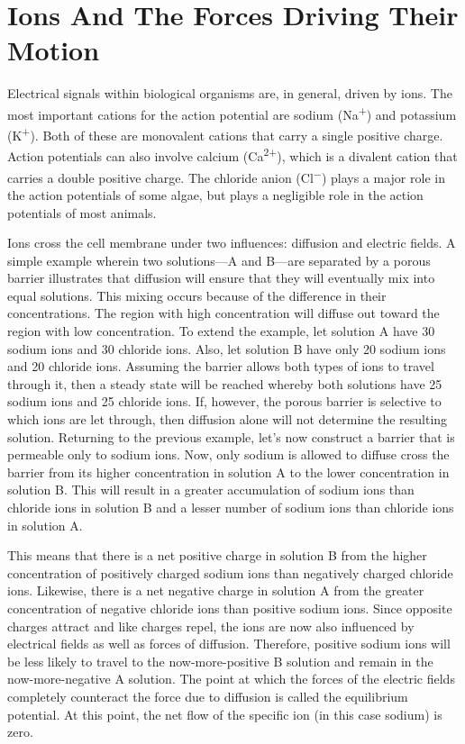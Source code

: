 \hypertarget{ions-and-the-forces-driving-their-motion}{%
\section{Ions And The Forces Driving Their Motion}\label{ions-and-the-forces-driving-their-motion}}

Electrical signals within biological organisms are, in general, driven by ions. The most important cations for the action potential are sodium (Na\textsuperscript{+}) and potassium (K\textsuperscript{+}). Both of these are monovalent cations that carry a single positive charge. Action potentials can also involve calcium (Ca\textsuperscript{2+}), which is a divalent cation that carries a double positive charge. The chloride anion (Cl\textsuperscript{−}) plays a major role in the action potentials of some algae, but plays a negligible role in the action potentials of most animals.

Ions cross the cell membrane under two influences: diffusion and electric fields. A simple example wherein two solutions---A and B---are separated by a porous barrier illustrates that diffusion will ensure that they will eventually mix into equal solutions. This mixing occurs because of the difference in their concentrations. The region with high concentration will diffuse out toward the region with low concentration. To extend the example, let solution A have 30 sodium ions and 30 chloride ions. Also, let solution B have only 20 sodium ions and 20 chloride ions. Assuming the barrier allows both types of ions to travel through it, then a steady state will be reached whereby both solutions have 25 sodium ions and 25 chloride ions. If, however, the porous barrier is selective to which ions are let through, then diffusion alone will not determine the resulting solution. Returning to the previous example, let's now construct a barrier that is permeable only to sodium ions. Now, only sodium is allowed to diffuse cross the barrier from its higher concentration in solution A to the lower concentration in solution B. This will result in a greater accumulation of sodium ions than chloride ions in solution B and a lesser number of sodium ions than chloride ions in solution A.

This means that there is a net positive charge in solution B from the higher concentration of positively charged sodium ions than negatively charged chloride ions. Likewise, there is a net negative charge in solution A from the greater concentration of negative chloride ions than positive sodium ions. Since opposite charges attract and like charges repel, the ions are now also influenced by electrical fields as well as forces of diffusion. Therefore, positive sodium ions will be less likely to travel to the now-more-positive B solution and remain in the now-more-negative A solution. The point at which the forces of the electric fields completely counteract the force due to diffusion is called the equilibrium potential. At this point, the net flow of the specific ion (in this case sodium) is zero.

